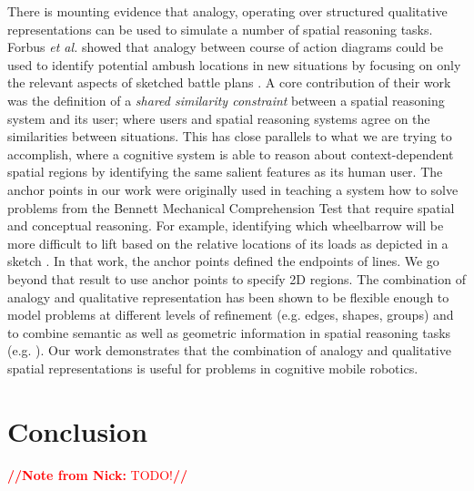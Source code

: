 \documentclass[letterpaper]{article}
\newcommand{\from}[2]{\textcolor{red}{\noindent\textbf{//}\textbf{Note
      from #1:}\textsc{ #2}\textbf{//}}}
\begin{document}
There is mounting evidence that analogy, operating over structured qualitative representations can be used to simulate a number of spatial reasoning tasks. Forbus \textit{et al.} showed that analogy between course of action diagrams could be used to identify potential ambush locations in new situations by focusing on only the relevant aspects of sketched battle plans \cite{Forbus/etal2003}. A core contribution of their work was the definition of a \textit{shared similarity constraint} between a spatial reasoning system and its user; where users and spatial reasoning systems agree on the similarities between situations. This has close parallels to what we are trying to accomplish, where a cognitive system is able to reason about context-dependent spatial regions by identifying the same salient features as its human user. The anchor points in our work were originally used in teaching a system how to solve problems from the Bennett Mechanical Comprehension Test that require spatial and conceptual reasoning. For example, identifying which wheelbarrow will be more difficult to lift based on the relative locations of its loads as depicted in a sketch \cite{Klenk/etal2005}. In that work, the anchor points defined the endpoints of lines. We go beyond that result to use anchor points to specify 2D regions.  The combination of analogy and qualitative representation has been shown to be flexible enough to model problems at different levels of refinement (e.g. edges, shapes, groups) \cite{Lovett&Forbus2011} and to combine semantic as well as geometric information in spatial reasoning tasks (e.g. \cite{Lockwood/etal2008}). Our work demonstrates that the combination of analogy and qualitative spatial representations is useful for problems in cognitive mobile robotics. 

\section{Conclusion}

\from{Nick}{TODO!}


% 

\clearpage



\end{document}
